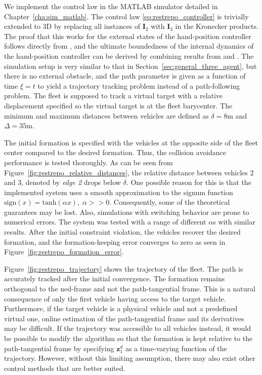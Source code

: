 We implement the control law in the MATLAB simulator detailed in Chapter~\ref{cha:sim_matlab}. The control law \eqref{eq:restrepo_controller} is trivially extended to 3D by replacing all instances of $\mathbf{I}_2$ with $\mathbf{I}_3$ in the Kronecker products. The proof that this works for the external states of the hand-position controller follows directly from \cite{restrepo_tracking--formation_2022}, and the ultimate boundedness of the internal dynamics of the hand-position controller can be derived by combining results from \cite{restrepo_tracking--formation_2022} and \cite{matous_trajectory_2023}. The simulation setup is very similar to that in Section~\ref{sec:general_three_agent}, but there is no external obstacle, and the path parameter is given as a function of time $\xi = t$ to yield a trajectory tracking problem instead of a path-following problem. The fleet is supposed to track a virtual target with a relative displacement specified so the virtual target is at the fleet barycenter. The minimum and maximum distances between vehicles are defined as $\delta = 8 \mathrm{m}$ and $\Delta = 35 \mathrm{m}$.

The initial formation is specified with the vehicles at the opposite side of the fleet center compared to the desired formation. Thus, the collision avoidance performance is tested thoroughly. As can be seen from Figure~\ref{fig:restrepo_relative_distances}, the relative distance between vehicles 2 and 3, denoted by \textit{edge 2} drops below $\delta$. One possible reason for this is that the implemented system uses a smooth approximation to the signum function $\mathrm{sign}(x) = \mathrm{tanh}(\alpha x), \; \alpha >> 0$. Consequently, some of the theoretical guarantees may be lost. Also, simulations with switching behavior are prone to numerical errors. The system was tested with a range of different $\alpha$s with similar results. After the initial constraint violation, the vehicles recover the desired formation, and the formation-keeping error converges to zero as seen in Figure~\ref{fig:restrepo_formation_error}.

Figure~\ref{fig:restrepo_trajectory} shows the trajectory of the fleet. The path is accurately tracked after the initial convergence. The formation remains orthogonal to the \gls{ned}-frame and not the path-tangential frame. This is a natural consequence of only the first vehicle having access to the target vehicle. Furthermore, if the target vehicle is a physical vehicle and not a predefined virtual one, online estimation of the path-tangential frame and its derivatives may be difficult. If the trajectory was accessible to all vehicles instead, it would be possible to modify the algorithm so that the formation is kept relative to the path-tangential frame by specifying $\mathbf{z}_1^d$ as a time-varying function of the trajectory. However, without this limiting assumption, there may also exist other control methods that are better suited.


